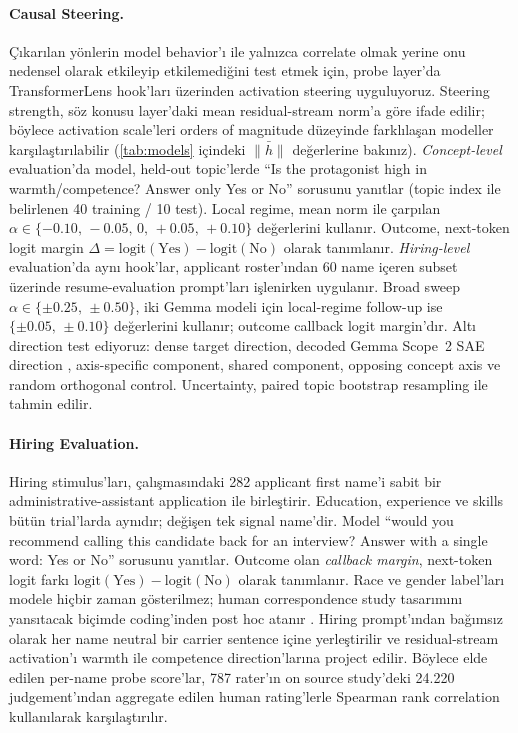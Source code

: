 \documentclass[twocolumn]{article}
\begin{document}
\paragraph{Causal Steering.}
Çıkarılan yönlerin model behavior'ı ile yalnızca correlate olmak yerine onu
nedensel olarak etkileyip etkilemediğini test etmek için, probe layer'da
TransformerLens hook'ları üzerinden activation steering
\citep{turner2023activation} uyguluyoruz. Steering strength, söz konusu
layer'daki mean residual-stream norm'a göre ifade edilir; böylece activation
scale'leri orders of magnitude düzeyinde farklılaşan modeller karşılaştırılabilir
(\autoref{tab:models} içindeki $\bar{\|h\|}$ değerlerine bakınız).
\textit{Concept-level} evaluation'da model, held-out topic'lerde ``Is the
protagonist high in warmth/competence? Answer only Yes or No'' sorusunu yanıtlar
(topic index ile belirlenen 40 training / 10 test). Local regime, mean norm ile
çarpılan $\alpha \in \{-0.10,\,-0.05,\,0,\,+0.05,\,+0.10\}$ değerlerini
kullanır. Outcome, next-token logit margin
$\Delta = \mathrm{logit}(\text{Yes}) - \mathrm{logit}(\text{No})$ olarak
tanımlanır. \textit{Hiring-level} evaluation'da aynı hook'lar, applicant
roster'ından 60 name içeren subset üzerinde resume-evaluation prompt'ları
işlenirken uygulanır. Broad sweep $\alpha \in \{\pm 0.25,\,\pm 0.50\}$,
iki Gemma modeli için local-regime follow-up ise $\{\pm 0.05,\,\pm 0.10\}$
değerlerini kullanır; outcome callback logit margin'dır. Altı direction test
ediyoruz: dense target direction, decoded Gemma Scope~2 SAE direction
\citep{deepmind2025gemmascope2}, axis-specific component, shared component,
opposing concept axis ve random orthogonal control. Uncertainty, paired topic
bootstrap resampling ile tahmin edilir.

\paragraph{Hiring Evaluation.}
Hiring stimulus'ları, \citet{gallo2024warmth} çalışmasındaki 282 applicant first
name'i sabit bir administrative-assistant application ile birleştirir. Education,
experience ve skills bütün trial'larda aynıdır; değişen tek signal name'dir.
Model ``would you recommend calling this candidate back for an interview? Answer
with a single word: Yes or No'' sorusunu yanıtlar. Outcome olan
\textit{callback margin}, next-token logit farkı
$\mathrm{logit}(\text{Yes}) - \mathrm{logit}(\text{No})$ olarak tanımlanır.
Race ve gender label'ları modele hiçbir zaman gösterilmez; human correspondence
study tasarımını yansıtacak biçimde \citet{gallo2024warmth} coding'inden post
hoc atanır \citep{bertrand2004emily}. Hiring prompt'ından bağımsız olarak her
name neutral bir carrier sentence içine yerleştirilir ve residual-stream
activation'ı warmth ile competence direction'larına project edilir. Böylece elde
edilen per-name probe score'lar, 787 rater'ın on source study'deki 24.220
judgement'ından aggregate edilen human rating'lerle Spearman rank correlation
kullanılarak karşılaştırılır.
\end{document}
